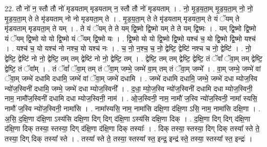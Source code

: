 \documentclass[17pt]{extarticle}
\begin{document}
22. तौ नो॑ न॒ स्तौ तौ नो॑ मृडयताम् मृडयताम् न॒ स्तौ तौ नो॑ मृडयताम् । . नो॒ मृ॒ड॒य॒ता॒म् मृ॒ड॒य॒ता॒म् नो॒ नो॒ मृ॒ड॒य॒ता॒म् ते ते मृ॑डयताम् नो नो मृडयता॒म् ते । . मृ॒ड॒य॒ता॒म् ते ते मृ॑डयताम् मृडयता॒म् ते यं ॅयम् ते मृ॑डयताम् मृडयता॒म् ते यम् । . ते यं ॅयम् ते ते यम् द्वि॒ष्मो द्वि॒ष्मो यम् ते ते यम् द्वि॒ष्मः । . यम् द्वि॒ष्मो द्वि॒ष्मो यं ॅयम् द्वि॒ष्मो यो यो द्वि॒ष्मो यं ॅयम् द्वि॒ष्मो यः । . द्वि॒ष्मो यो यो द्वि॒ष्मो द्वि॒ष्मो यश्च॑ च॒ यो द्वि॒ष्मो द्वि॒ष्मो यश्च॑ । . यश्च॑ च॒ यो यश्च॑ नो नश्च॒ यो यश्च॑ नः । . च॒ नो॒ न॒श्च॒ च॒ नो॒ द्वेष्टि॒ द्वेष्टि॑ नश्च च नो॒ द्वेष्टि॑ । . नो॒ द्वेष्टि॒ द्वेष्टि॑ नो नो॒ द्वेष्टि॒ तम् तम् द्वेष्टि॑ नो नो॒ द्वेष्टि॒ तम् । . द्वेष्टि॒ तम् तम् द्वेष्टि॒ द्वेष्टि॒ तं ॅवां᳚ ॅवा॒म् तम् द्वेष्टि॒ द्वेष्टि॒ तं ॅवा᳚म् । . तं ॅवां᳚ ॅवा॒म् तम् तं ॅवा॒म् जम्भे॒ जम्भे॑ वा॒म् तम् तं ॅवा॒म् जम्भे᳚ । . वा॒म् जम्भे॒ जम्भे॑ वां ॅवा॒म् जम्भे॑ दधामि दधामि॒ जम्भे॑ वां ॅवा॒म् जम्भे॑ दधामि । . जम्भे॑ दधामि दधामि॒ जम्भे॒ जम्भे॑ दधा म्योज॒स्वि न्यो॑ज॒स्विनी॑ दधामि॒ जम्भे॒ जम्भे॑ दधा म्योज॒स्विनी᳚ । . द॒धा॒ म्यो॒ज॒स्वि न्यो॑ज॒स्विनी॑ दधामि दधा म्योज॒स्विनी॒ नाम॒ नामौ॑ज॒स्विनी॑ दधामि दधा म्योज॒स्विनी॒ नाम॑ । . ओ॒ज॒स्विनी॒ नाम॒ नामौ॑ ज॒स्वि न्यो॑ज॒स्विनी॒ नामा᳚ स्यसि॒ नामौ॑ ज॒स्वि न्यो॑ज॒स्विनी॒ नामा॑सि । . नामा᳚स्यसि॒ नाम॒ नामा॑सि दक्षि॒णा द॑क्षि॒णा ऽसि॒ नाम॒ नामा॑सि दक्षि॒णा । . अ॒सि॒ द॒क्षि॒णा द॑क्षि॒णा ऽस्य॑सि दक्षि॒णा दिग् दिग् द॑क्षि॒णा ऽस्य॑सि दक्षि॒णा दिक् । . द॒क्षि॒णा दिग् दिग् द॑क्षि॒णा द॑क्षि॒णा दिक् तस्या॒ स्तस्या॒ दिग् द॑क्षि॒णा द॑क्षि॒णा दिक् तस्याः᳚ । . दिक् तस्या॒ स्तस्या॒ दिग् दिक् तस्या᳚ स्ते ते॒ तस्या॒ दिग् दिक् तस्या᳚ स्ते । . तस्या᳚ स्ते ते॒ तस्या॒ स्तस्या᳚ स्त॒ इन्द्र॒ इन्द्र॑ स्ते॒ तस्या॒ स्तस्या᳚ स्त॒ इन्द्रः॑ । \newline
\end{document}
